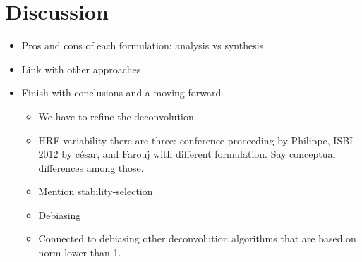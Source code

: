 \section{Discussion}

\begin{itemize}
    \item Pros and cons of each formulation: analysis vs synthesis
    \item Link with other approaches
    \item Finish with conclusions and a moving forward
    \begin{itemize}
        \item We have to refine the deconvolution
        \item HRF variability there are three: conference proceeding by Philippe, ISBI 2012 by césar, and Farouj with different formulation. Say conceptual differences among those.
        \item Mention stability-selection
        \item Debiasing
        \item Connected to debiasing other deconvolution algorithms that are based on norm lower than 1.
    \end{itemize}
\end{itemize}